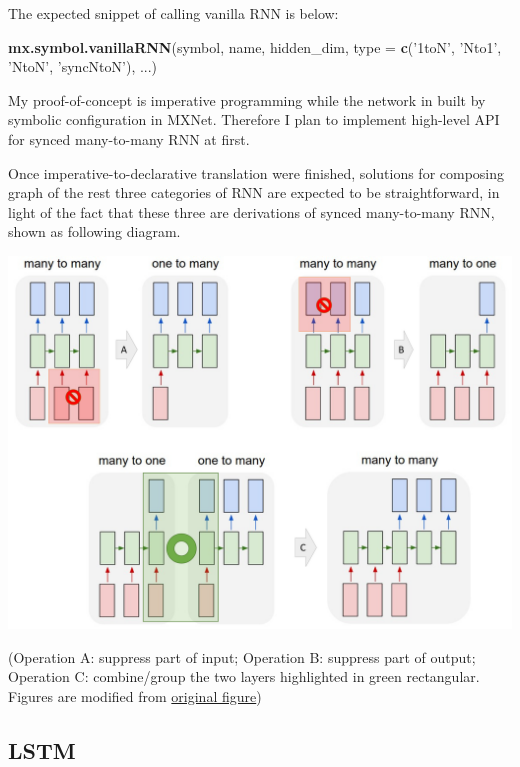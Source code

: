 \documentclass[]{article}
\newenvironment{Shaded}{\begin{snugshade}}{\end{snugshade}}
\newcommand{\KeywordTok}[1]{\textcolor[rgb]{0.13,0.29,0.53}{\textbf{{#1}}}}
\newcommand{\DataTypeTok}[1]{\textcolor[rgb]{0.13,0.29,0.53}{{#1}}}
\newcommand{\StringTok}[1]{\textcolor[rgb]{0.31,0.60,0.02}{{#1}}}
\newcommand{\NormalTok}[1]{{#1}}
\begin{document}
The expected snippet of calling vanilla RNN is below:

\begin{Shaded}
\begin{Highlighting}[]
\KeywordTok{mx.symbol.vanillaRNN}\NormalTok{(symbol, name, hidden_dim, }\DataTypeTok{type =} \KeywordTok{c}\NormalTok{(}\StringTok{'1toN'}\NormalTok{, }\StringTok{'Nto1'}\NormalTok{, }\StringTok{'NtoN'}\NormalTok{, }\StringTok{'syncNtoN'}\NormalTok{), ...)}
\end{Highlighting}
\end{Shaded}

My proof-of-concept is imperative programming while the network in built
by symbolic configuration in MXNet. Therefore I plan to implement
high-level API for synced many-to-many RNN at first.

Once imperative-to-declarative translation were finished, solutions for
composing graph of the rest three categories of RNN are expected to be
straightforward, in light of the fact that these three are derivations
of synced many-to-many RNN, shown as following diagram.

\includegraphics{resources/43C2B745DA43E6CA3EDBD2BB1EF4BCA8.png}

(Operation A: suppress part of input; Operation B: suppress part of
output; Operation C: combine/group the two layers highlighted in green
rectangular. Figures are modified from
\href{http://karpathy.github.io/2015/05/21/rnn-effectiveness/}{original
figure})

\subsection{LSTM}\label{lstm}
\end{document}
